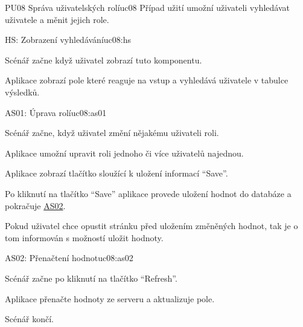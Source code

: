 \begin{usecase}{PU08 Správa uživatelských rolí}{uc08}
    Případ užití umožní uživateli vyhledávat uživatele a měnit jejich role.

    \begin{scenario}{HS: Zobrazení vyhledávání}{uc08:hs}
        \item Scénář začne když uživatel zobrazí tuto komponentu.
        \item Aplikace zobrazí pole které reaguje na vstup a vyhledává uživatele v tabulce výsledků.
    \end{scenario}

    \begin{scenario}{AS01: Úprava rolí}{uc08:as01}
        \item Scénář začne, když uživatel změní nějakému uživateli roli.
        \item Aplikace umožní upravit roli jednoho či více uživatelů najednou.
        \item Aplikace zobrazí tlačítko sloužící k uložení informací \enquote{Save}.
        \item Po kliknutí na tlačítko \enquote{Save} aplikace provede uložení hodnot do databáze a pokračuje \hyperref[uc02:as02]{AS02}.
        \item Pokud uživatel chce opustit stránku před uložením změněných hodnot, tak je o tom informován s možností uložit hodnoty.
    \end{scenario}

    \begin{scenario}{AS02: Přenačtení hodnot}{uc08:as02}
        \item Scénář začne po kliknutí na tlačítko \enquote{Refresh}.
        \item Aplikace přenačte hodnoty ze serveru a aktualizuje pole.
        \item Scénář končí.
    \end{scenario}
\end{usecase}